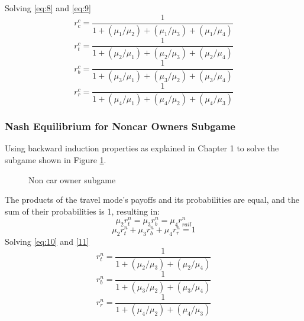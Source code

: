 Solving \ref{eq:8} and \ref{eq:9}
\begin{equation}\label{eq:5555}
r^c_{c} = \frac{1}{1+ (\mu_1 / \mu_2)+(\mu_1 / \mu_3)+(\mu_1 / \mu_4)}
\end{equation}
\begin{equation}
r^c_{t} = \frac{1}{1+ (\mu_2 / \mu_1)+(\mu_2 / \mu_3)+(\mu_2 / \mu_4)}
\end{equation}
\begin{equation}
r^c_{b} = \frac{1}{1+ (\mu_3 / \mu_1)+(\mu_3 / \mu_2)+(\mu_3 / \mu_4)}
\end{equation}
\begin{equation}
r^c_{r} = \frac{1}{1+ (\mu_4 / \mu_1)+(\mu_4 / \mu_2)+(\mu_4 / \mu_3)}
\end{equation}

\subsubsection{Nash Equilibrium for Noncar Owners Subgame}
Using backward induction properties as explained in Chapter 1 to solve the subgame shown in Figure \ref{fig:4}. \\

\begin{figure}[!h]
  \centering
  \caption{Non car owner subgame\label{fig:4}}
\end{figure}
The products of the travel mode's payoffs and its probabilities are equal, and the sum of their probabilities is 1, resulting in: 
\begin{equation}\label{eq:10}
\mu_2 r^n_{t} = \mu_3 r^n_{b} = \mu_4 r^n_{rail}
\end{equation}
\begin{equation}\label{11}
\mu_2 r^n_{t} + \mu_3 r^n_{b} + \mu_4 r^n_{r} = 1
\end{equation}
Solving \ref{eq:10} and \ref{11} 
\begin{equation}
r^n_{t} = \frac{1}{1+(\mu_2 / \mu_3)+(\mu_2 / \mu_4)}
\end{equation}
\begin{equation}
r^n_{b} = \frac{1}{1+ (\mu_3 / \mu_2)+(\mu_3 / \mu_4)}
\end{equation}
\begin{equation}\label{eq:666}
r^n_{r} = \frac{1}{1+ (\mu_4 / \mu_2)+(\mu_4 / \mu_3)}
\end{equation}
